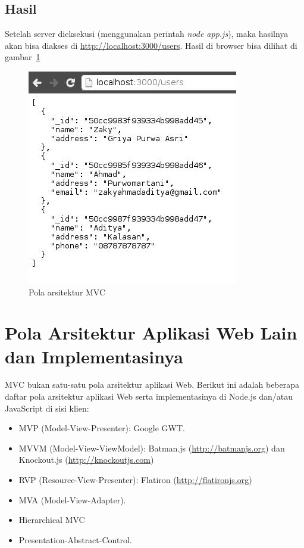 \subsection{Hasil}

Setelah server dieksekusi (menggunakan perintah \textit{node app.js}), maka hasilnya akan bisa diakses di \url{http://localhost:3000/users}. Hasil di browser bisa dilihat di gambar~\ref{fig:hasil-mvc}

  \begin{figure}
    \begin{center}
      \includegraphics[scale=0.5]{images/mvc-result.jpg}
    \end{center}
    \caption{Pola arsitektur MVC}
    \label{fig:hasil-mvc}
  \end{figure}

\section{Pola Arsitektur Aplikasi Web Lain dan Implementasinya}

MVC bukan satu-satu pola arsitektur aplikasi Web. Berikut ini adalah beberapa daftar pola arsitektur aplikasi Web serta implementasinya di Node.js dan/atau JavaScript di sisi klien:
\begin{itemize}
\item MVP (Model-View-Presenter): Google GWT.
\item MVVM (Model-View-ViewModel): Batman.js (\url{http://batmanjs.org}) dan Knockout.js (\url{http://knockoutjs.com})
\item RVP (Resource-View-Presenter): Flatiron (\url{http://flatironjs.org})
\item MVA (Model-View-Adapter).
\item Hierarchical MVC
\item Presentation-Abstract-Control.
\end{itemize}

